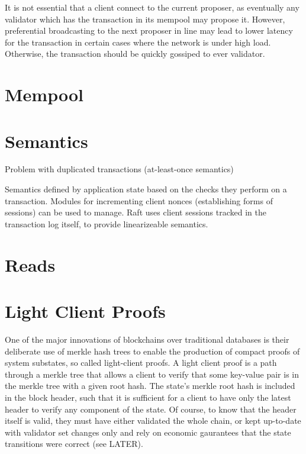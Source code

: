 It is not essential that a client connect to the current proposer, 
as eventually any validator which has the transaction in its mempool may propose it.
However, preferential broadcasting to the next proposer in line may lead to lower latency for the transaction
in certain cases where the network is under high load. Otherwise, the transaction should be quickly gossiped to ever validator.

\section{Mempool}

\section{Semantics}

Problem with duplicated transactions (at-least-once semantics)

Semantics defined by application state based on the checks they perform on a transaction.
Modules for incrementing client nonces (establishing forms of sessions) can be used to manage.
Raft uses client sessions tracked in the transaction log itself, to provide linearizeable semantics.


\section{Reads} 

\section{Light Client Proofs}

One of the major innovations of blockchains over traditional databases is their deliberate use of merkle hash trees to enable the production
of compact proofs of system substates, so called light-client proofs.
A light client proof is a path through a merkle tree that allows a client to verify that some key-value pair is in the merkle tree with a given root hash.
The state's merkle root hash is included in the block header, such that it is sufficient for a client to have only the latest header to verify any component of the state.
Of course, to know that the header itself is valid, they must have either validated the whole chain, 
or kept up-to-date with validator set changes only and rely on economic gaurantees that the state transitions were correct (see LATER).
